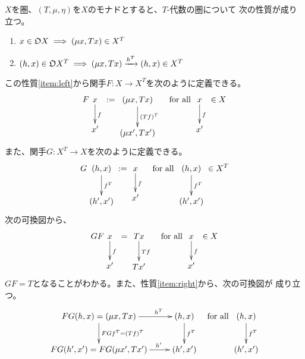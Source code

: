 {	$X$を圏、$(T,\mu,\eta)$を$X$のモナドとすると、$T$-代数の圏について
	次の性質が成り立つ。
	\begin{enumerate}\setlength{\itemsep}{-1mm} %
		\item\label{item:left} $x\in{\mathfrak{O}} X\implies (\mu x,Tx)\in X^T$
		\item\label{item:right} 
		$(h,x)\in{\mathfrak{O}} X^T\implies (\mu x,Tx)\xrightarrow[{}]{h^T}(h,x)\in X^T$
	\end{enumerate} %
	この性質\ref{item:left}から関手$F:X\to X^T$を次のように定義できる。
	\begin{equation*}\begin{split}
		F\xymatrix{
			x \ar[d]^f \\ x'
		} := \xymatrix{
			(\mu x, Tx) \ar[d]^{(Tf)^T} \\ (\mu x', Tx')
		} \quad\text{for all }\xymatrix{
			x \ar[d]^f \\ x'
		}\in X
	\end{split}\end{equation*}
	また、関手$G:X^T\to X$を次のように定義できる。
	\begin{equation*}\begin{split}
		G\xymatrix{
			(h,x) \ar[d]^{f^T} \\ (h', x')
		} := \xymatrix{
			x \ar[d]^{f} \\ x'
		} \quad\text{for all }\xymatrix{
			(h,x) \ar[d]^{f^T} \\ (h', x')
		}\in X^T
	\end{split}\end{equation*}
	次の可換図から、
	\begin{equation*}\begin{split}
		GF\xymatrix{
			x \ar[d]^f \\ x'
		} = \xymatrix{
			Tx \ar[d]^{Tf} \\ Tx'
		} \quad\text{for all }\xymatrix{
			x \ar[d]^f \\ x'
		}\in X
	\end{split}\end{equation*}
	$GF=T$となることがわかる。また、性質\ref{item:right}から、次の可換図が
	成り立つ。
	\begin{equation*}\begin{split}
		\xymatrix{
			FG(h,x) = (\mu x, Tx) \ar[d]^{FGf^T = (Tf)^T} \ar[r]^(.7){h^T}
			& (h,x) \ar[d]^{f^T} \\ 
			FG(h',x') = FG(\mu x', Tx') \ar[r]^(.7){h'} & (h', x')
		} \quad\text{for all }\xymatrix{
			(h,x) \ar[d]^{f^T} \\ (h', x')
}
\end{split}
\end{equation*}}

